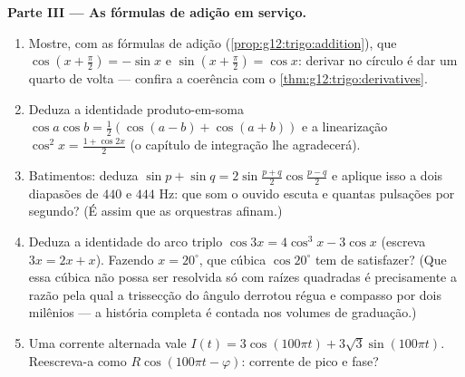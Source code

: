 \begin{problem}
\medskip
\noindent\textbf{Parte III --- As fórmulas de adição em serviço.}
\begin{enumerate}[resume]
  \item Mostre, com as fórmulas de adição
        (\cref{prop:g12:trigo:addition}), que
        $\cos\left(x + \frac\pi2\right) = -\sin x$ e
        $\sin\left(x + \frac\pi2\right) = \cos x$: derivar no
        círculo é dar um quarto de volta --- confira a coerência
        com o \cref{thm:g12:trigo:derivatives}.
  \item Deduza a identidade produto-em-soma
        $\cos a \cos b = \frac12\left(\cos(a - b) +
        \cos(a + b)\right)$ e a linearização
        $\cos^2 x = \frac{1 + \cos 2x}{2}$ (o capítulo de
        integração lhe agradecerá).
  \item Batimentos: deduza
        $\sin p + \sin q = 2 \sin\frac{p + q}{2}
        \cos\frac{p - q}{2}$ e aplique isso a dois diapasões de
        $440$ e $444$ Hz: que som o ouvido escuta e quantas
        pulsações por segundo? (É assim que as orquestras
        afinam.)
  \item Deduza a identidade do arco triplo
        $\cos 3x = 4\cos^3 x - 3\cos x$ (escreva $3x = 2x + x$).
        Fazendo $x = 20^\circ$, que  cúbica
        $\cos 20^\circ$ tem de satisfazer? (Que essa cúbica não
        possa ser resolvida só com raízes quadradas é
        precisamente a razão pela qual a trissecção do ângulo
        derrotou régua e compasso por dois milênios --- a
        história completa é contada nos volumes de graduação.)
  \item Uma corrente alternada vale
        $I(t) = 3\cos(100\pi t) + 3\sqrt3 \sin(100\pi t)$.
        Reescreva-a como $R\cos(100\pi t - \varphi)$: corrente de
        pico e fase?
\end{enumerate}


\end{problem}
